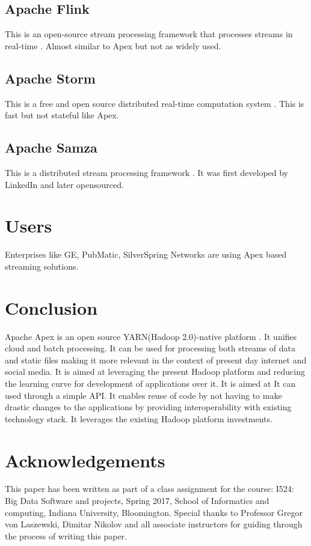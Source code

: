 \documentclass[9pt,twocolumn,twoside]{styles/osajnl}
\begin{document}
\subsection{Apache Flink}
This is an open-source stream processing framework that processes streams in real-time \cite{www-apacheapexflink}. Almost similar to Apex but not as widely used.
\subsection{Apache Storm}
This is a free and open source distributed real-time computation system \cite{www-apachestormsite}. This is fast but not stateful like Apex.
\subsection{Apache Samza}
This is a distributed stream processing framework \cite{www-apachesamzasite}. It was first developed by LinkedIn and later opensourced.
\section{Users}
Enterprises like GE, PubMatic, SilverSpring Networks are using Apex based streaming solutions. 
\section{Conclusion}
Apache Apex is an open source YARN(Hadoop 2.0)-native platform \cite{www-apacheapexwiki}. It unifies cloud and batch processing. It can be used for processing both streams of data and static files making it more relevant in the context of present day internet and social media. It is aimed at leveraging the present Hadoop platform and reducing the learning curve for development of applications over it. It is aimed at It can used through a simple API. It enables reuse of code by not having to make drastic changes to the applications by providing interoperability with existing technology stack. It leverages the existing Hadoop platform investments.



\section*{Acknowledgements}

This paper has been written as part of a class assignment for the course: 
I524: Big Data Software and projects, Spring 2017, School of Informatics and computing, Indiana University, Bloomington.
Special thanks to Professor Gregor von Laszewski, Dimitar Nikolov and all associate instructors for guiding through the process of writing this paper.




 
\end{document}
